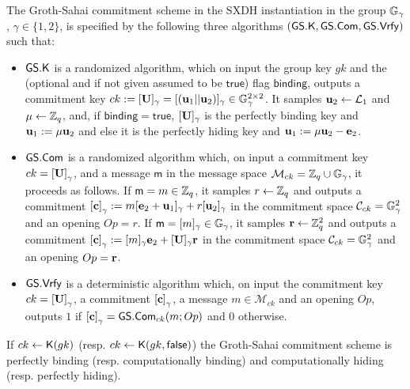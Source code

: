 \begin{definition} The Groth-Sahai commitment scheme in the SXDH instantiation in the group $\mathbb{G}_\gamma$, $\gamma\in\{1,2\}$, is  specified by the following three algorithms 
	$(\mathsf{GS}.\mathsf{K},\mathsf{GS}.\mathsf{Com},\mathsf{GS}.\mathsf{Vrfy})$ such that:
	\begin{itemize} 
		\item  $\mathsf{GS}.\mathsf{K}$ is a randomized algorithm, which on input the group key $gk$ and the (optional and if not given assumed to be $\mathsf{true}$) flag $\mathsf{binding}$, outputs a commitment key $ck:=[\mathbf{{U}}]_\gamma=[(\mathbf{u}_1||\mathbf{u}_2)]_\gamma \in\mathbb{G}_\gamma^{2\times 2}$. It samples $\mathbf{u}_2\gets\mathcal{L}_{1}$ and $\mu\gets\mathbb{Z}_q$, and, 
if $\mathsf{binding}=\mathsf{true}$, $[\mathbf{{U}}]_\gamma$ is the {perfectly binding key} and $\mathbf{u}_1:=\mu\mathbf{u}_2$ and else it is the {perfectly hiding key} and $\mathbf{u}_1:=\mu\mathbf{u}_2-\mathbf{e}_2$.
		\item $\mathsf{GS}.\mathsf{Com}$ is a randomized algorithm which, on input a commitment key $ck=\left[\mathbf{{U}}\right]_\gamma$, and a message 
		$\mathsf{m}$ in the message space $\mathcal{M}_{ck}=\mathbb{Z}_q\cup\mathbb{G}_\gamma$, it proceeds as follows. If $\mathsf{m}=m\in\mathbb{Z}_q$, it samples $r \gets \mathbb{Z}_q$ and outputs a commitment $\left[\mathbf{c}\right]_\gamma := m[\mathbf{e}_2+\mathbf{u}_1]_\gamma+r[\mathbf{u}_2]_\gamma$ in the commitment space $\mathcal{C}_{ck}=\mathbb{G}_\gamma^2$ and an opening $Op=r$. If $\mathsf{m}=[m]_\gamma\in\mathbb{G}_\gamma$, it samples $\mathbf{r} \gets \mathbb{Z}_q^2$ and outputs a commitment $\left[\mathbf{c}\right]_\gamma := [m]_\gamma\mathbf{e}_2+[\mathbf{{U}}]_\gamma\mathbf{r}$ in the commitment space $\mathcal{C}_{ck}=\mathbb{G}_\gamma^2$ and an opening $Op=\mathbf{r}$.
		\item $\mathsf{GS}.\mathsf{Vrfy}$ is a deterministic algorithm which, on input the commitment key $ck=\left[\mathbf{{U}}\right]_\gamma$, a commitment $\left[\mathbf{c}\right]_\gamma$,  a message 
		$m \in \mathcal{M}_{ck}$ and an opening $Op$, outputs $1$ if $\left[\mathbf{c}\right]_\gamma={\mathsf{GS}}.\mathsf{Com}_{ck}(m;Op)$
		and $0$ otherwise.
	\end{itemize}
\end{definition}

\begin{theorem} If $ck\gets\mathsf{K}(gk)$ (resp. $ck\gets\mathsf{K}(gk,\mathsf{false})$) the Groth-Sahai commitment scheme is perfectly binding (resp. computationally binding) and computationally hiding (resp. perfectly hiding).
\end{theorem}

